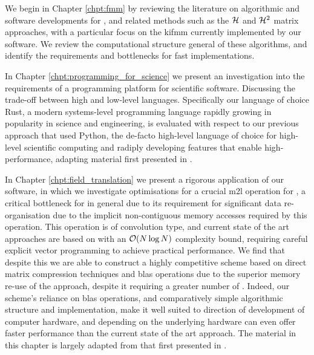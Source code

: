 We begin in Chapter \ref{chpt:fmm} by reviewing the literature on algorithmic and software developments for , and related methods such as the $\mathcal{H}$ and $\mathcal{H}^2$ matrix approaches, with a particular focus on the \acrshort{kifmm} currently implemented by our software. We review the computational structure general of these algorithms, and identify the requirements and bottlenecks for fast implementations.

In Chapter \ref{chpt:programming_for_science} we present an investigation into the requirements of a programming platform for scientific software. Discussing the trade-off between high and low-level languages. Specifically our language of choice Rust, a modern systems-level programming language rapidly growing in popularity in science and engineering, is evaluated with respect to our previous approach that used Python, the de-facto high-level language of choice for high-level scientific computing and radiply developing features that enable high-performance, adapting material first presented in \cite{kailasa2022pyexafmm}.

In Chapter \ref{chpt:field_translation} we present a rigorous application of our software, in which we investigate optimisations for a crucial \acrfull{m2l} operation for , a critical bottleneck for  in general due to its requirement for significant data re-organisation due to the implicit non-contiguous memory accesses required by this operation. This operation is of convolution type, and current state of the art approaches are based on  with an $\mathcal{O}(N \log{N})$ complexity bound, requiring careful explicit vector programming to achieve practical performance. We find that despite this we are able to construct a highly competitive scheme based on direct matrix compression techniques and \acrfull{blas} operations due to the superior memory re-use of the approach, despite it requiring a greater number of . Indeed, our scheme's reliance on \acrshort{blas} operations, and comparatively simple algorithmic structure and implementation, make it well suited to direction of development of computer hardware, and depending on the underlying hardware can even offer faster performance than the current state of the art approach. The material in this chapter is largely adapted from that first presented in \cite{kailasa2024m2ltranslationoperatorskernel}.

